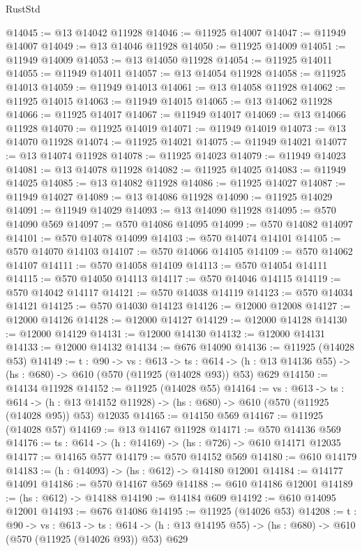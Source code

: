\begin{lexlean}{RustStd}
\begin{coremodule}
@14045 := @13 @14042 @11928
@14046 := @11925 @14007
@14047 := @11949 @14007
@14049 := @13 @14046 @11928
@14050 := @11925 @14009
@14051 := @11949 @14009
@14053 := @13 @14050 @11928
@14054 := @11925 @14011
@14055 := @11949 @14011
@14057 := @13 @14054 @11928
@14058 := @11925 @14013
@14059 := @11949 @14013
@14061 := @13 @14058 @11928
@14062 := @11925 @14015
@14063 := @11949 @14015
@14065 := @13 @14062 @11928
@14066 := @11925 @14017
@14067 := @11949 @14017
@14069 := @13 @14066 @11928
@14070 := @11925 @14019
@14071 := @11949 @14019
@14073 := @13 @14070 @11928
@14074 := @11925 @14021
@14075 := @11949 @14021
@14077 := @13 @14074 @11928
@14078 := @11925 @14023
@14079 := @11949 @14023
@14081 := @13 @14078 @11928
@14082 := @11925 @14025
@14083 := @11949 @14025
@14085 := @13 @14082 @11928
@14086 := @11925 @14027
@14087 := @11949 @14027
@14089 := @13 @14086 @11928
@14090 := @11925 @14029
@14091 := @11949 @14029
@14093 := @13 @14090 @11928
@14095 := @570 @14090 @569
@14097 := @570 @14086 @14095
@14099 := @570 @14082 @14097
@14101 := @570 @14078 @14099
@14103 := @570 @14074 @14101
@14105 := @570 @14070 @14103
@14107 := @570 @14066 @14105
@14109 := @570 @14062 @14107
@14111 := @570 @14058 @14109
@14113 := @570 @14054 @14111
@14115 := @570 @14050 @14113
@14117 := @570 @14046 @14115
@14119 := @570 @14042 @14117
@14121 := @570 @14038 @14119
@14123 := @570 @14034 @14121
@14125 := @570 @14030 @14123
@14126 := @12000 @12008
@14127 := @12000 @14126
@14128 := @12000 @14127
@14129 := @12000 @14128
@14130 := @12000 @14129
@14131 := @12000 @14130
@14132 := @12000 @14131
@14133 := @12000 @14132
@14134 := @676 @14090
@14136 := @11925 (@14028 @53)
@14149 := {t : @90} ->
  {vs : @613} ->
  {ts : @614} -> (h : @13 @14136 @55) -> (hs : @680) -> @610 (@570 (@11925 (@14028 @93)) @53) @629
@14150 := @14134 @11928
@14152 := @11925 (@14028 @55)
@14164 := {vs : @613} ->
  {ts : @614} ->
  (h : @13 @14152 @11928) -> (hs : @680) -> @610 (@570 (@11925 (@14028 @95)) @53) @12035
@14165 := @14150 @569
@14167 := @11925 (@14028 @57)
@14169 := @13 @14167 @11928
@14171 := @570 @14136 @569
@14176 := {ts : @614} -> (h : @14169) -> (hs : @726) -> @610 @14171 @12035
@14177 := @14165 @577
@14179 := @570 @14152 @569
@14180 := @610 @14179
@14183 := (h : @14093) -> (hs : @612) -> @14180 @12001
@14184 := @14177 @14091
@14186 := @570 @14167 @569
@14188 := @610 @14186 @12001
@14189 := (hs : @612) -> @14188
@14190 := @14184 @609
@14192 := @610 @14095 @12001
@14193 := @676 @14086
@14195 := @11925 (@14026 @53)
@14208 := {t : @90} ->
  {vs : @613} ->
  {ts : @614} -> (h : @13 @14195 @55) -> (hs : @680) -> @610 (@570 (@11925 (@14026 @93)) @53) @629

\end{coremodule}
\end{lexlean}
